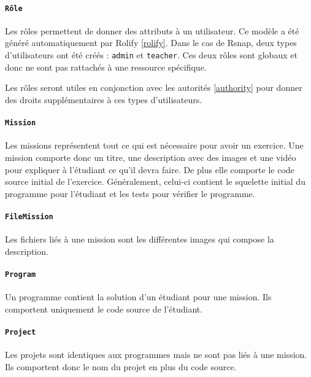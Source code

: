 \paragraph{\texttt{Rôle}} Les rôles permettent de donner des attributs à un utilisateur. Ce modèle a été généré automatiquement par Rolify \ref{rolify}. Dans le cas de Rsnap, deux types d'utilisateurs ont été créés : \texttt{admin} et \texttt{teacher}. Ces deux rôles sont globaux et donc ne sont pas rattachés à une ressource spécifique.%

Les rôles seront utiles en conjonction avec les autorités \ref{authority} pour donner des droits supplémentaires à ces types d'utilisateurs.

\paragraph{\texttt{Mission}} Les missions représentent tout ce qui est nécessaire pour avoir un exercice. Une mission comporte donc un titre, une description avec des images et une vidéo pour expliquer à l'étudiant ce qu'il devra faire. De plus elle comporte le code source initial de l'exercice. Généralement, celui-ci contient le squelette initial du programme pour l'étudiant et les tests pour vérifier le programme. 

\paragraph{\texttt{FileMission}} Les fichiers liés à une mission sont les différentes images qui compose la description. %

\paragraph{\texttt{Program}} Un programme contient la solution d'un étudiant pour une mission. Ils comportent uniquement le code source de l'étudiant.

\paragraph{\texttt{Project}} Les projets sont identiques aux programmes mais ne sont pas liés à une mission. Ils comportent donc le nom du projet en plus du code source.

